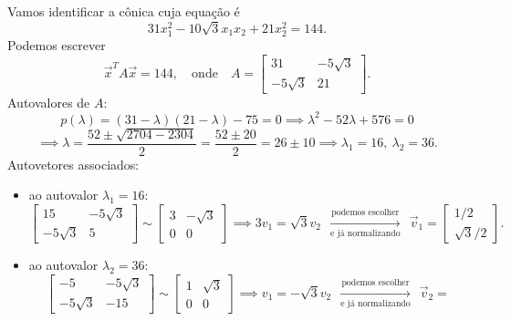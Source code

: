 \documentclass[../livro.tex]{subfiles}
\begin{document}
\begin{example}
	Vamos identificar a cônica cuja equação é
	\begin{equation}
	31 x_1^2 - 10\sqrt{3} x_1x_2 + 21 x_2^2 = 144.
	\end{equation} Podemos escrever
	\begin{equation}
	\vec{x}^T A \vec{x} = 144, \quad \text{onde} \quad
	A = 
	\begin{bmatrix}
	31 & -5\sqrt{3} \\
	-5\sqrt{3} &  21
	\end{bmatrix}.
	\end{equation} Autovalores de $A$:
	\begin{equation}
	p(\lambda) = (31 - \lambda)(21-\lambda) - 75 = 0 \implies \lambda^2 - 52 \lambda + 576
	= 0
	\end{equation}
	\begin{equation}
	\implies \lambda = \frac{52 \pm \sqrt{2704 - 2304}}{2} = \frac{52 \pm 20}{2} = 26\pm 10 \implies \lambda_1 = 16, \ \lambda_2 = 36.
	\end{equation} Autovetores associados:
	\begin{itemize}
		\item  ao autovalor $\lambda_1 = 16$:
		\begin{equation}
		\begin{bmatrix}
		15 & -5\sqrt{3} \\
		-5\sqrt{3} &  5
		\end{bmatrix} \sim
		\begin{bmatrix}
		3 & -\sqrt{3} \\
		0 &  0
		\end{bmatrix} \implies 
		3v_1 = \sqrt{3} v_2 \ \ \xrightarrow[\text{e já normalizando}]{\text{podemos escolher}} \ \  \vec{v}_1 = 
		\begin{bmatrix}
		1/2 \\ \sqrt{3}/2
		\end{bmatrix}.
		\end{equation}
		\item ao autovalor $\lambda_2 = 36$:
		\begin{equation}
		\begin{bmatrix}
		-5 & -5\sqrt{3} \\
		-5\sqrt{3} &  -15
		\end{bmatrix} \sim
		\begin{bmatrix}
		1 & \sqrt{3} \\
		0 &  0
		\end{bmatrix} \implies 
		v_1 = - \sqrt{3} v_2 \ \ \xrightarrow[\text{e já normalizando}]{\text{podemos escolher}} \ \  \vec{v}_2 = 

\end{equation}
\end{itemize}
\end{example}
\end{document}
